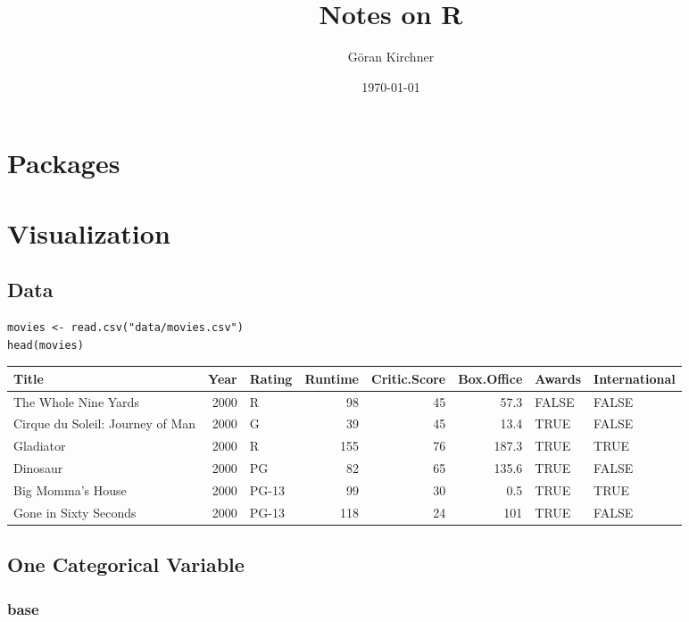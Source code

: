 \documentclass[a4paper, captions=tableheading]{tufte-book}
\author{Göran Kirchner}
\date{\today}
\title{Notes on R}
\begin{document}
\maketitle

\chapter{Packages}
\label{sec:orgheadline1}

\chapter{Visualization}
\label{sec:orgheadline12}

\section{Data}
\label{sec:orgheadline2}

\begin{verbatim}
movies <- read.csv("data/movies.csv")
head(movies)
\end{verbatim}

\begin{center}
\begin{tabular}{lrlrrrll}
\toprule
Title & Year & Rating & Runtime & Critic.Score & Box.Office & Awards & International\\
\midrule
The Whole Nine Yards & 2000 & R & 98 & 45 & 57.3 & FALSE & FALSE\\
Cirque du Soleil: Journey of Man & 2000 & G & 39 & 45 & 13.4 & TRUE & FALSE\\
Gladiator & 2000 & R & 155 & 76 & 187.3 & TRUE & TRUE\\
Dinosaur & 2000 & PG & 82 & 65 & 135.6 & TRUE & FALSE\\
Big Momma's House & 2000 & PG-13 & 99 & 30 & 0.5 & TRUE & TRUE\\
Gone in Sixty Seconds & 2000 & PG-13 & 118 & 24 & 101 & TRUE & FALSE\\
\bottomrule
\end{tabular}
\end{center}

\section{One Categorical Variable}
\label{sec:orgheadline6}

\subsection{base}
\label{sec:orgheadline3}
\end{document}
